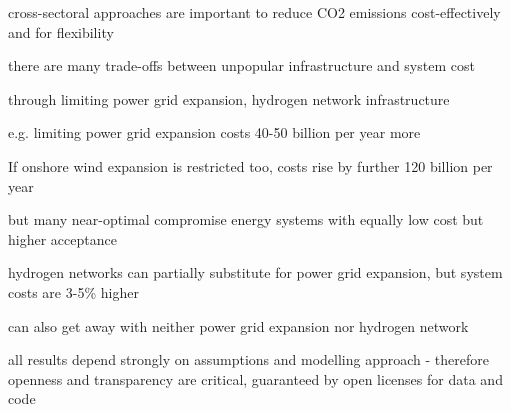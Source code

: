 cross-sectoral approaches are important to reduce CO2 emissions cost-effectively and for flexibility

there are many trade-offs between unpopular infrastructure and system cost

through limiting power grid expansion, hydrogen network infrastructure

e.g. limiting power grid expansion costs 40-50 billion per year more

If onshore wind expansion is restricted too, costs rise by further 120 billion per year

but many near-optimal compromise energy systems with equally low cost but higher acceptance

hydrogen networks can partially substitute for power grid expansion, but system costs are
3-5\% higher

can also get away with neither power grid expansion nor hydrogen network

all results depend strongly on assumptions and modelling approach
- therefore openness and transparency are critical, guaranteed by open licenses for data and code